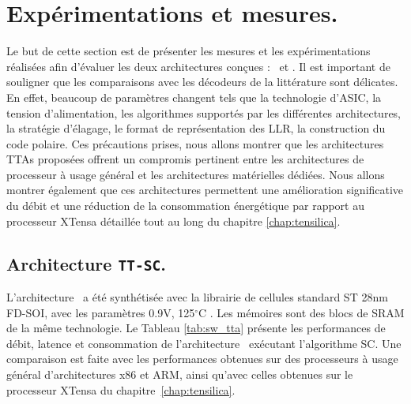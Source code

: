\section{Expérimentations et mesures.}
Le but de cette section est de présenter les mesures et les expérimentations réalisées afin d'évaluer les deux architectures conçues : \TTSC~et \TTSCAN. Il est important de souligner que les comparaisons avec les décodeurs de la littérature sont délicates. En effet, beaucoup de paramètres changent tels que la technologie d'ASIC, la tension d'alimentation, les algorithmes supportés par les différentes architectures, la stratégie d'élagage, le format de représentation des LLR, la construction du code polaire. Ces précautions prises, nous allons montrer que les architectures TTAs proposées offrent un compromis pertinent entre les architectures de processeur à usage général et les architectures matérielles dédiées. Nous allons montrer également que ces architectures permettent une amélioration significative du débit et une réduction de la consommation énergétique par rapport au processeur XTensa détaillée tout au long du chapitre \ref{chap:tensilica}.

\subsection{Architecture \texttt{TT-SC}.}
\label{sec:tta_res}

L'architecture \TTSC~a été synthétisée avec la librairie de cellules standard ST 28nm FD-SOI, avec les paramètres 0.9V, 125$^{\circ}$C . Les mémoires sont des blocs de SRAM de la même technologie. Le Tableau \ref{tab:sw_tta} présente les performances de débit, latence et consommation de l'architecture \TTSC~exécutant l'algorithme SC. Une comparaison est faite avec les performances obtenues sur des processeurs à usage général d'architectures x86 et ARM, ainsi qu'avec celles obtenues sur le processeur XTensa du chapitre~\ref{chap:tensilica}.


